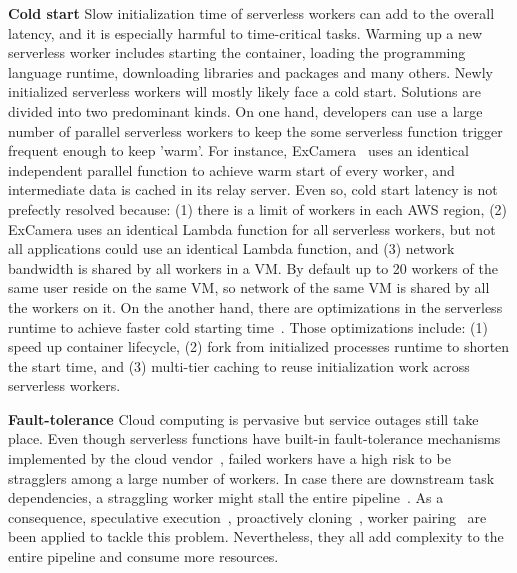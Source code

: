 \documentclass{kcc}
\begin{document}
\textbf{Cold start} Slow initialization time of serverless workers can add to the overall latency, and it is especially harmful to time-critical tasks. 
Warming up a new serverless worker includes starting the container, loading the programming language runtime, downloading libraries and packages and many others. Newly initialized serverless workers will mostly likely face a cold start. 
Solutions are divided into two predominant kinds. On one hand, developers can use a large number of parallel serverless workers to keep the some serverless function trigger frequent enough to keep 'warm'. For instance, ExCamera~\cite{Excamera:6} uses an identical independent parallel function to achieve warm start of every worker, and intermediate data is cached in its relay server. Even so, cold start latency is not prefectly resolved because: 
(1) there is a limit of workers in each AWS region, 
(2) ExCamera uses an identical Lambda function for all serverless workers, but not all applications could use an identical Lambda function, 
and (3) network bandwidth is shared by all workers in a VM. By default up to 20 workers of the same user reside on the same VM, so network of the same VM is shared by all the workers on it.
On the another hand, there are optimizations in the serverless runtime to achieve faster cold starting time~\cite{SOCK:18}. Those optimizations include:
(1) speed up container lifecycle, 
(2) fork from initialized processes runtime to shorten the start time, 
and (3) multi-tier caching to reuse initialization work across serverless workers.

 
\textbf{Fault-tolerance} Cloud computing is pervasive but service outages still take place. Even though serverless functions have built-in fault-tolerance mechanisms implemented by the cloud vendor~\cite{WorkstationNetworks:14, Kubernetes:16}, failed workers have a high risk to be stragglers among a large number of workers. In case there are downstream task dependencies, a straggling worker might stall the entire pipeline~\cite{Straggler:4}. As a consequence, speculative execution~\cite{Mapreduce:5}, proactively cloning~\cite{Straggler:4}, worker pairing~\cite{Sprocket:3} are been applied to tackle this problem. Nevertheless, they all add complexity to the entire pipeline and consume more resources. 
\end{document}
